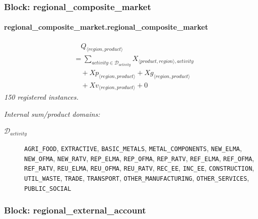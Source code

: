 \documentclass[11pt]{article}
\begin{document}
\subsubsection*{Block: regional\_composite\_market}
\paragraph{regional\_composite\_market.regional\_composite\_market}
\begin{align*}
&\quad Q_{\langle region, product\rangle}\\
&= \sum_{activity \in \mathcal{D}_{activity}} X_{\langle product, region\rangle,activity}\\
&\quad {}+ Xp_{\langle region, product\rangle} + Xg_{\langle region, product\rangle}\\
&\quad {}+ Xv_{\langle region, product\rangle} + 0
\end{align*}
\noindent\emph{150 registered instances.}\par
\noindent\emph{Internal sum/product domains:}\par
\begin{description}
\item[\(\mathcal{D}_{activity}\)] \texttt{AGRI\_FOOD}, \texttt{EXTRACTIVE}, \texttt{BASIC\_METALS}, \texttt{METAL\_COMPONENTS}, \texttt{NEW\_ELMA}, \texttt{NEW\_OFMA}, \texttt{NEW\_RATV}, \texttt{REP\_ELMA}, \texttt{REP\_OFMA}, \texttt{REP\_RATV}, \texttt{REF\_ELMA}, \texttt{REF\_OFMA}, \texttt{REF\_RATV}, \texttt{REU\_ELMA}, \texttt{REU\_OFMA}, \texttt{REU\_RATV}, \texttt{REC\_EE}, \texttt{INC\_EE}, \texttt{CONSTRUCTION}, \texttt{UTIL\_WASTE}, \texttt{TRADE}, \texttt{TRANSPORT}, \texttt{OTHER\_MANUFACTURING}, \texttt{OTHER\_SERVICES}, \texttt{PUBLIC\_SOCIAL}
\end{description}
\subsubsection*{Block: regional\_external\_account}
\end{document}
